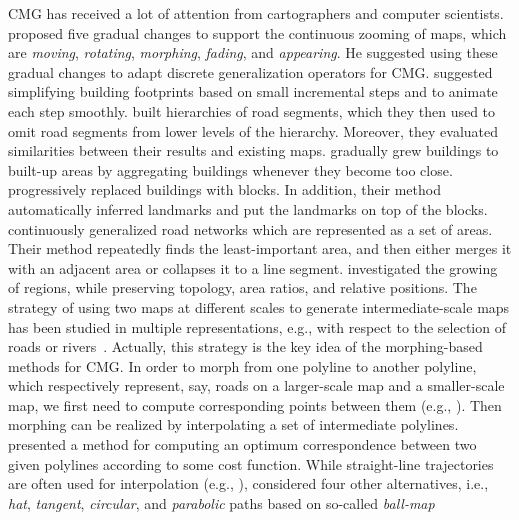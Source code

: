 \documentclass[acmsmall,natbib=false]{acmart}
\begin{document}
CMG has received a lot of attention
from cartographers and computer scientists.
\Textcite{vanKreveld2001} proposed five gradual changes
to support the continuous zooming of maps, 
which are \emph{moving}, \emph{rotating}, \emph{morphing}, 
\emph{fading}, and \emph{appearing}. 
He suggested using these gradual changes 
to adapt discrete generalization operators for CMG.
\textcite{Sester2005_CG} suggested simplifying building
footprints based on small incremental steps and 
to animate each step smoothly.
\textcite{Li2012Continuous} built hierarchies of road segments,
which they then used to omit road segments 
from lower levels of the hierarchy.
Moreover, they evaluated similarities 
between their results and existing maps.
\textcite{Peng2017Building} gradually grew
buildings to built-up areas by aggregating buildings 
whenever they become too close.
\textcite{Touya2017Progressive} progressively replaced
buildings with blocks. 
In addition, their method automatically inferred landmarks 
and put the landmarks on top of the blocks.
\textcite{Suba2016Road} continuously generalized road networks
which are represented as a set of areas.
Their method repeatedly finds the least-important area, 
and then either merges it with an adjacent area 
or collapses it to a line segment.
\textcite{Danciger2009} investigated the growing of regions, 
while preserving topology, area ratios, and
relative positions.
The strategy of using two maps at different scales
to generate intermediate-scale maps has been studied in multiple
representations, e.g., with respect to the selection of roads or
rivers~\parencite{Peng2012River,Girres2014}. 
Actually, this strategy is the key idea of the
morphing-based methods for CMG.
In order to morph from one polyline to another polyline,
which respectively represent, say, roads on a larger-scale map 
and a smaller-scale map, we first need to compute 
corresponding points between them (e.g., \citealp{Cecconi2003,Noellenburg2008,Chazal2010BallMap,Deng2015,Li2017_Building,Li2017Annealing}).
Then morphing can be realized by interpolating a set of 
intermediate polylines.
\textcite{Noellenburg2008} presented a method for computing an optimum
correspondence between two given polylines according to some cost function.
While straight-line trajectories 
are often used for interpolation
(e.g., \citealp{Cecconi2003,Deng2015}),
\textcite{Whited2011BallMorph} considered four other alternatives, i.e., \emph{hat}, \emph{tangent}, 
\emph{circular}, and \emph{parabolic} paths
based on so-called \emph{ball-map}
\end{document}
